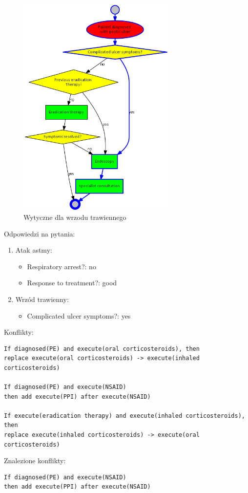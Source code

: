 \newpage
\begin{figure}[H]
\centering
\includegraphics[width=0.7\textwidth]{img/peptic-ulcer.png}
\caption{Wytyczne dla wrzodu trawiennego}
\label{fig:pu}
\end{figure}
\newpage
\noindent Odpowiedzi na pytania:
\begin{enumerate}
\item{Atak astmy:
	\begin{itemize}
	\item{Respiratory arrest?: no}
	\item{Response to treatment?: good}
	\end{itemize}
}
\item{Wrzód trawienny:
	\begin{itemize}
	\item{Complicated ulcer symptoms?: yes}
	\end{itemize}
}
\end{enumerate}
Konflikty:
\begin{verbatim}
If diagnosed(PE) and execute(oral corticosteroids), then 
replace execute(oral corticosteroids) -> execute(inhaled corticosteroids)

If diagnosed(PE) and execute(NSAID)
then add execute(PPI) after execute(NSAID)

If execute(eradication therapy) and execute(inhaled corticosteroids), then
replace execute(inhaled corticosteroids) -> execute(oral corticosteroids)
\end{verbatim}
Znalezione konflikty:
\begin{verbatim}
If diagnosed(PE) and execute(NSAID) 
then add execute(PPI) after execute(NSAID)
\end{verbatim}
\newpage

